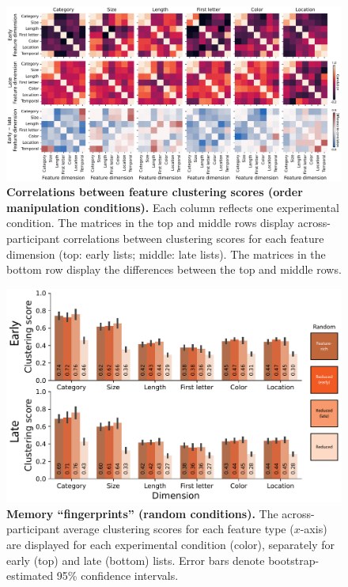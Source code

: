 \documentclass{article}
\begin{document}
\begin{figure}[tp] \centering
    \includegraphics[width=\textwidth]{figures/clustering_correlations}
    
    \caption{\textbf{Correlations between feature clustering scores (order
    manipulation conditions).} Each column reflects one experimental condition.
    The matrices in the top and middle rows display across-participant
    correlations between clustering scores for each feature dimension (top:
    early lists; middle: late lists). The matrices in the bottom row display
    the differences between the top and middle rows.}

        \label{fig:clustering-correlations}
\end{figure}


\begin{figure}[tp] \centering
    \includegraphics[width=\textwidth]{figures/fingerprints_random}
    
\caption{\textbf{Memory ``fingerprints'' (random conditions).} The
across-participant average clustering scores for each feature type ($x$-axis) are
displayed for each experimental condition (color), separately for early (top)
and late (bottom) lists. Error bars denote bootstrap-estimated 95\% confidence
intervals.}

\label{fig:fingerprints-random} \end{figure}
    
\end{document}
